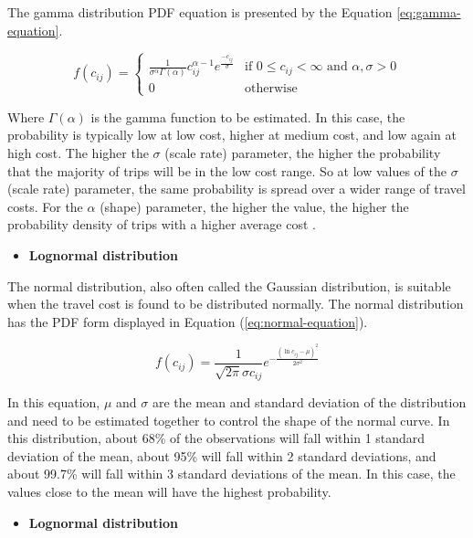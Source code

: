 \documentclass[preprint, 3p,
authoryear]{elsarticle} %
\providecommand{\tightlist}{%
  \setlength{\itemsep}{0pt}\setlength{\parskip}{0pt}}
\begin{document}
The gamma distribution PDF equation is presented by the Equation
\ref{eq:gamma-equation}.

\begin{equation}
f(c_{ij}) = 
   \begin{cases}
\frac{1}{\sigma^\alpha\Gamma(\alpha)} c_{ij}^{\alpha-1} e^{\frac{-c_{ij}}{\sigma}} & \text{if } 0 \leq c_{ij} <      \infty  \text{ and } \alpha, \sigma > 0 \\ 0 & \text{otherwise}
   \end{cases}
\label{eq:gamma-equation}
\end{equation}

Where \(\Gamma(\alpha)\) is the gamma function to be estimated. In this
case, the probability is typically low at low cost, higher at medium
cost, and low again at high cost. The higher the \(\sigma\) (scale rate)
parameter, the higher the probability that the majority of trips will be
in the low cost range. So at low values of the \(\sigma\) (scale rate)
parameter, the same probability is spread over a wider range of travel
costs. For the \(\alpha\) (shape) parameter, the higher the value, the
higher the probability density of trips with a higher average cost
\citep{soukhov2024}.

\begin{itemize}
\tightlist
\item
  \textbf{Lognormal distribution}
\end{itemize}

The normal distribution, also often called the Gaussian distribution, is
suitable when the travel cost is found to be distributed normally. The
normal distribution has the PDF form displayed in Equation
(\ref{eq:normal-equation}).

\begin{equation}
f(c_{ij}) = \frac{1}{\sqrt{2\pi} \sigma c_{ij}} e^{-\frac{(\ln c_{ij} - \mu)^2}{2\sigma^2}}
\label{eq:normal-equation}
\end{equation}

In this equation, \(\mu\) and \(\sigma\) are the mean and standard
deviation of the distribution and need to be estimated together to
control the shape of the normal curve. In this distribution, about 68\%
of the observations will fall within 1 standard deviation of the mean,
about 95\% will fall within 2 standard deviations, and about 99.7\% will
fall within 3 standard deviations of the mean. In this case, the values
close to the mean will have the highest probability.

\begin{itemize}
\tightlist
\item
  \textbf{Lognormal distribution}
\end{itemize}
\end{document}
